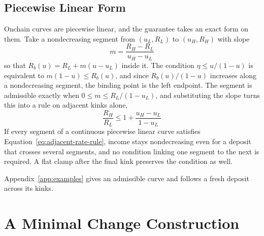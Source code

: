 \documentclass[11pt,a4paper]{article}
\begin{document}
\subsection{Piecewise Linear Form}

Onchain curves are piecewise linear, and the guarantee takes an exact form on them. Take a nondecreasing segment from $(u_L,R_L)$ to $(u_H,R_H)$ with slope
\begin{equation}
m=\frac{R_H-R_L}{u_H-u_L}
\end{equation}
so that $R_b(u)=R_L+m(u-u_L)$ inside it. The condition $\eta\leq u/(1-u)$ is equivalent to $m(1-u)\leq R_b(u)$, and since $R_b(u)/(1-u)$ increases along a nondecreasing segment, the binding point is the left endpoint. The segment is admissible exactly when $0\leq m\leq R_L/(1-u_L)$, and substituting the slope turns this into a rule on adjacent kinks alone,
\begin{equation}
\boxed{
\frac{R_H}{R_L}
\leq
1+\frac{u_H-u_L}{1-u_L}
}
\label{eq:adjacent-rate-rule}
\end{equation}
If every segment of a continuous piecewise linear curve satisfies Equation~\ref{eq:adjacent-rate-rule}, income stays nondecreasing even for a deposit that crosses several segments, and no condition linking one segment to the next is required. A flat clamp after the final kink preserves the condition as well.

Appendix~\ref{app:examples} gives an admissible curve and follows a fresh deposit across its kinks.

\section{A Minimal Change Construction}
\label{sec:minimal}
\end{document}
